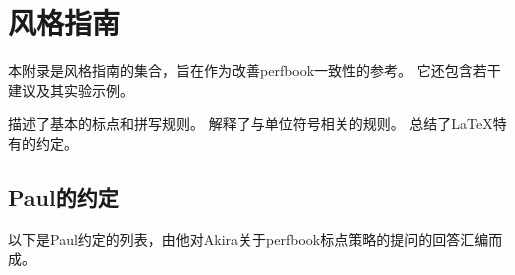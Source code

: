 
\chapter{风格指南}
\label{chp:app:styleguide:Style Guide}
%

本附录是风格指南的集合，旨在作为改善perfbook一致性的参考。
它还包含若干建议及其实验示例。

 描述了基本的标点和拼写规则。
 解释了与单位符号相关的规则。
 总结了\LaTeX 特有的约定。

\section{Paul的约定}
\label{sec:app:styleguide:Paul's Conventions}

以下是Paul约定的列表，由他对Akira关于perfbook标点策略的提问的回答汇编而成。

